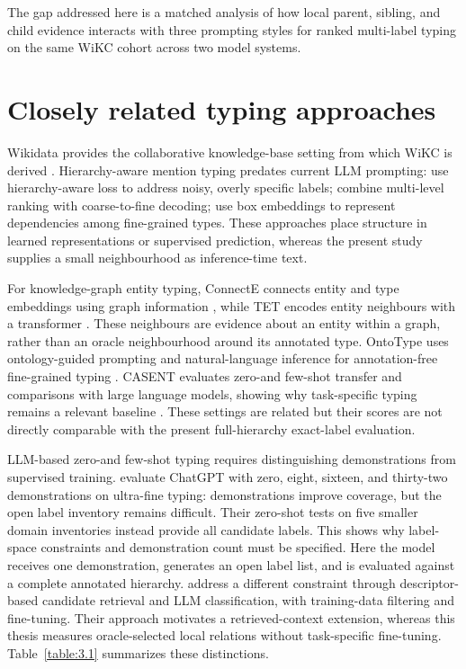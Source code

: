 The gap addressed here is a matched analysis of how local parent, sibling, and child evidence interacts with three prompting styles for ranked multi-label typing on the same WiKC cohort across two model systems.


\FloatBarrier

\section{Closely related typing approaches}

Wikidata provides the collaborative knowledge-base setting from which WiKC is derived \citep{vrandecic2014}. Hierarchy-aware mention typing predates current LLM prompting: \citet{xu2018} use hierarchy-aware loss to address noisy, overly specific labels; \citet{chen2020} combine multi-level ranking with coarse-to-fine decoding; \citet{onoe2021} use box embeddings to represent dependencies among fine-grained types. These approaches place structure in learned representations or supervised prediction, whereas the present study supplies a small neighbourhood as inference-time text.


For knowledge-graph entity typing, ConnectE connects entity and type embeddings using graph information \citep{zhao2020}, while TET encodes entity neighbours with a transformer \citep{hu2022}. These neighbours are evidence about an entity within a graph, rather than an oracle neighbourhood around its annotated type. OntoType uses ontology-guided prompting and natural-language inference for annotation-free fine-grained typing \citep{komarlu2024}. CASENT evaluates zero-and few-shot transfer and comparisons with large language models, showing why task-specific typing remains a relevant baseline \citep{feng2023}. These settings are related but their scores are not directly comparable with the present full-hierarchy exact-label evaluation.


LLM-based zero-and few-shot typing requires distinguishing demonstrations from supervised training. \citet{feng2023} evaluate ChatGPT with zero, eight, sixteen, and thirty-two demonstrations on ultra-fine typing: demonstrations improve coverage, but the open label inventory remains difficult. Their zero-shot tests on five smaller domain inventories instead provide all candidate labels. This shows why label-space constraints and demonstration count must be specified. Here the model receives one demonstration, generates an open label list, and is evaluated against a complete annotated hierarchy. \citet{ma2026} address a different constraint through descriptor-based candidate retrieval and LLM classification, with training-data filtering and fine-tuning. Their approach motivates a retrieved-context extension, whereas this thesis measures oracle-selected local relations without task-specific fine-tuning. Table~\ref{table:3.1} summarizes these distinctions.


